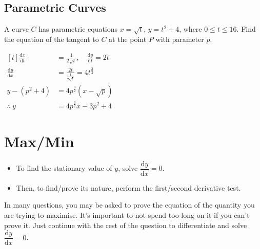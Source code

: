 \documentclass[a4paper,11pt,oneside]{book}
\providecommand{\cdisp}[1]{\par\noindent$\displaystyle\begin{aligned}[t]#1\end{aligned}$\par\smallskip}
\renewcommand{\cdisp}[1]{\par\noindent\hfill$\displaystyle\begin{aligned}[t]#1\end{aligned}$\hfill\null\par\smallskip}
\begin{document}
\subsection{Parametric Curves}
\exlab {\small[MI 2025 Prelim P2 Q2(i)]}\par
A curve $C$ has parametric equations $x=\sqrt{t}$, $y=t^{2}+4$, where $0\leqslant t\leqslant16$. Find the equation of the tangent to $C$ at the point $P$ with parameter $p$.
\cdisp{\frac{\mathrm{d}x}{\mathrm{d}t}&=\frac{1}{2\sqrt{t}},\quad\frac{\mathrm{d}y}{\mathrm{d}t}=2t\\
\frac{\mathrm{d}y}{\mathrm{d}x}&=\frac{2t}{\frac{1}{2\sqrt{t}}}=4t^{\frac{3}{2}}\\
y-\left(p^{2}+4\right)&=4p^{\frac{3}{2}}\left(x-\sqrt{p}\right)\\
\therefore\ y&=4p^{\frac{3}{2}}x-3p^{2}+4}
\section{Max/Min}
\begin{itemize}
\item To find the stationary value of $y$, solve $\dfrac{\mathrm{d}y}{\mathrm{d}x}=0$.
\item Then, to find/prove its nature, perform the first/second derivative test.
\end{itemize}
\begin{info}[title=Important Note]
In many questions, you may be asked to prove the equation of the quantity you are trying to maximise. It's important to not spend too long on it if you can't prove it. Just continue with the rest of the question to differentiate and solve $\dfrac{\mathrm{d}y}{\mathrm{d}x}=0$.
\end{info}
\par\medskip
\end{document}
